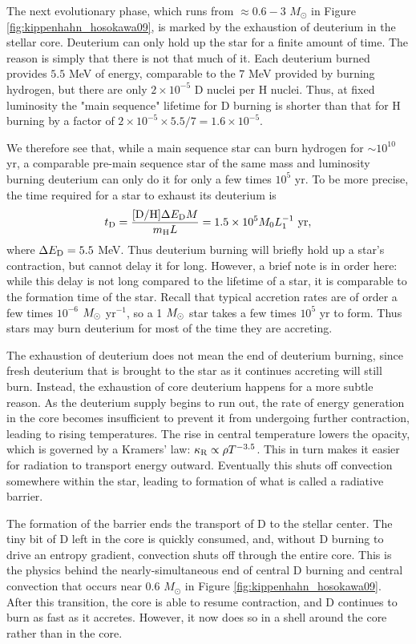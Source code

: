 The next evolutionary phase, which runs from $\approx 0.6 - 3$ $M_\odot$ in Figure \ref{fig:kippenhahn_hosokawa09}, is marked by the exhaustion of deuterium in the stellar core. Deuterium can only hold up the star for a finite amount of time. The reason is simply that there is not that much of it. Each deuterium burned provides $5.5$ MeV of energy, comparable to the $7$ MeV provided by burning hydrogen, but there are only $2\times 10^{-5}$ D nuclei per H nuclei. Thus, at fixed luminosity the "main sequence" lifetime for D burning is shorter than that for H burning by a factor of $2\times 10^{-5} \times 5.5/7 = 1.6\times 10^{-5}$.

We therefore see that, while a main sequence star can burn hydrogen for $\sim 10^{10}$ yr, a comparable pre-main sequence star of the same mass and luminosity burning deuterium can only do it for only a few times $10^5$ yr. To be more precise, the time required for a star to exhaust its deuterium is
\begin{equation}
t_{\rm D} = \frac{[\mbox{D}/\mbox{H}] \Delta E_{\rm D} M}{m_{\rm H} L} = 1.5\times 10^5 M_{0} L_1^{-1}\mbox{ yr},
\end{equation}
where $\Delta E_{\rm D}= 5.5$ MeV. Thus deuterium burning will briefly hold up a star's contraction, but cannot delay it for long. However, a brief note is in order here: while this delay is not long compared to the lifetime of a star, it is comparable to the formation time of the star. Recall that typical accretion rates are of order a few times $10^{-6}$ $M_{\odot}$ yr$^{-1}$, so a 1 $M_{\odot}$ star takes a few times $10^5$ yr to form. Thus stars may burn deuterium for most of the time they are accreting.

The exhaustion of deuterium does not mean the end of deuterium burning, since fresh deuterium that is brought to the star as it continues accreting will still burn. Instead, the exhaustion of core deuterium happens for a more subtle reason. As the deuterium supply begins to run out, the rate of energy generation in the core becomes insufficient to prevent it from undergoing further contraction, leading to rising temperatures. The rise in central temperature lowers the opacity, which is governed by a Kramers' law: $\kappa_{\rm R} \propto \rho T^{-3.5}$. This in turn makes it easier for radiation to transport energy outward. Eventually this shuts off convection somewhere within the star, leading to formation of what is called a radiative barrier.

The formation of the barrier ends the transport of D to the stellar center. The tiny bit of D left in the core is quickly consumed, and, without D burning to drive an entropy gradient, convection shuts off through the entire core. This is the physics behind the nearly-simultaneous end of central D burning and central convection that occurs near $0.6$ $M_\odot$ in Figure \ref{fig:kippenhahn_hosokawa09}. After this transition, the core is able to resume contraction, and D continues to burn as fast as it accretes. However, it now does so in a shell around the core rather than in the core.

